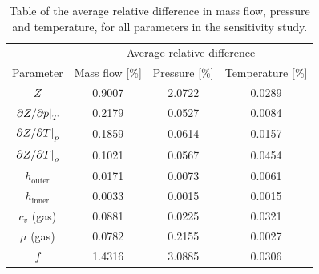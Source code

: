 \begin{table}[!hb]
    \caption{
        Table of the average relative difference in mass flow, pressure and temperature, for all parameters in the sensitivity study. 
        \label{tab:averageImpact} %
    } %
    \centering %
    \begin{tabular}{cccc} %
        \toprule
        & \multicolumn{3}{c}{Average relative difference} \\ \cmidrule(r){2-4}
        \parbox{2.5cm}{\centering Parameter} & Mass flow [\si{\percent}] & Pressure [\si{\percent}] & Temperature [\si{\percent}] \\
        \midrule
        $Z$ & 0.9007 & 2.0722 & 0.0289 \\
        $\eval{\partial Z/\partial p}_T$ & 0.2179 & 0.0527 & 0.0084 \\
        $\eval{\partial Z/\partial T}_p$ & 0.1859 & 0.0614 & 0.0157 \\
        $\eval{\partial Z/\partial T}_\rho$ & 0.1021 & 0.0567 & 0.0454 \\
        $h_\mathrm{outer}$ & 0.0171 & 0.0073 & 0.0061 \\
        $h_\mathrm{inner}$ & 0.0033 & 0.0015 & 0.0015 \\
        $c_v$ (gas) & 0.0881 & 0.0225 & 0.0321 \\
        $\mu$ (gas) & 0.0782 & 0.2155 & 0.0027 \\
        $f$ & 1.4316 & 3.0885 & 0.0306 \\
        \bottomrule
    \end{tabular}
\end{table}

